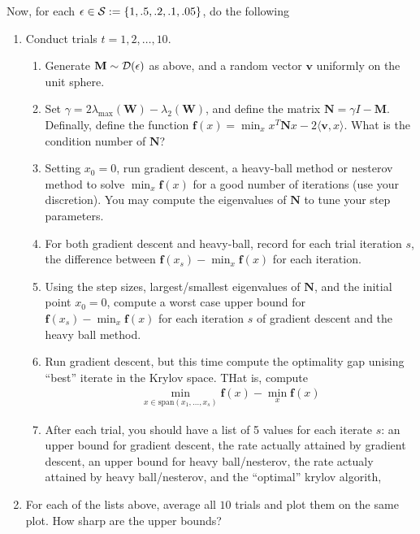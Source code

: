 \documentclass[12pt]{article}
\begin{document}
	Now, for each $\epsilon \in {\cal S} := \{1,.5,.2,.1,.05\}$, do the following
	\begin{enumerate}
		\item Conduct trials $t = 1,2,\dots,10$.
		\begin{enumerate}
		\item Generate $\mathbf{M} \sim {\cal D}(\epsilon)$ as above, and a random vector $\mathbf{v}$ uniformly on the unit sphere. 
		\item Set $\gamma = 2\lambda_{\max}(\mathbf{W}) - \lambda_{2}(\mathbf{W})$, and define the matrix $\mathbf{N} = \gamma I  - \mathbf{M}$. Definally, define the function $\mathbf{f}(x) = \min_{x} x^T \mathbf{N} x - 2 \langle \mathbf{v}, x \rangle$. What is the condition number of $\mathbf{N}$?
		\item Setting $x_0 = 0$, run gradient descent, a heavy-ball method or nesterov method to solve $\min_{x} \mathbf{f}(x)$ for a good number of iterations (use your discretion). You may compute the eigenvalues of $\mathbf{N}$ to tune your step parameters. 
		\item For both gradient descent and heavy-ball, record for each trial iteration $s$, the difference between $\mathbf{f}(x_s) - \min_{x} \mathbf{f}(x)$ for each iteration. 
		\item Using the step sizes, largest/smallest eigenvalues of $\mathbf{N}$, and the initial point $x_0 = 0$, compute a worst case upper bound for $\mathbf{f}(x_s) - \min_{x} \mathbf{f}(x)$ for each iteration $s$ of gradient descent and the heavy ball method.
		\item Run gradient descent, but this time compute the optimality gap unising ``best'' iterate in the Krylov space. THat is, compute 
		\begin{eqnarray}
		\min_{x \in \mathrm{span}(x_1,\dots,x_s)}\mathbf{f}(x) - \min_{x} \mathbf{f}(x)
		\end{eqnarray}
		\item After each trial, you should have a list of 5 values for each iterate $s$: an upper bound for gradient descent, the rate actually attained by gradient descent, an upper bound for heavy ball/nesterov, the rate actualy attained by heavy ball/nesterov, and the ``optimal'' krylov algorith,
	\end{enumerate}
	\item For each of the lists above, average all $10$ trials and plot them on the same plot. How sharp are the upper bounds?
	\end{enumerate}
\end{document}
